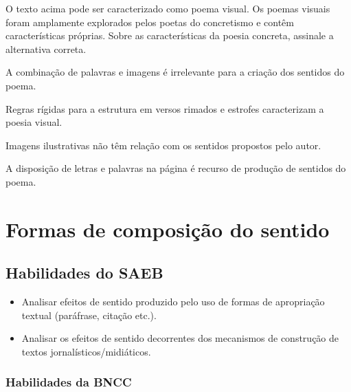 
O texto acima pode ser caracterizado como poema visual. Os poemas visuais
foram amplamente explorados pelos poetas do concretismo e contêm
características próprias. Sobre as características da poesia concreta,
assinale a alternativa correta.

\begin{escolha}

  \item A combinação de palavras e imagens é irrelevante para a criação dos sentidos do poema. 

  \item Regras rígidas para a estrutura em versos rimados e estrofes caracterizam a poesia visual.

  \item Imagens ilustrativas não têm relação com os sentidos propostos pelo autor.

  \item A disposição de letras e palavras na página é recurso de produção de sentidos do poema.

\end{escolha}

\chapter{Formas de composição do sentido}

\section*{Habilidades do SAEB}

\begin{itemize}
  
  \item Analisar efeitos de sentido produzido pelo uso de formas de apropriação 
  textual (paráfrase, citação etc.).
  
  \item Analisar os efeitos de sentido decorrentes dos mecanismos de construção 
  de textos jornalísticos/midiáticos.

\end{itemize}


\subsection{Habilidades da BNCC}


